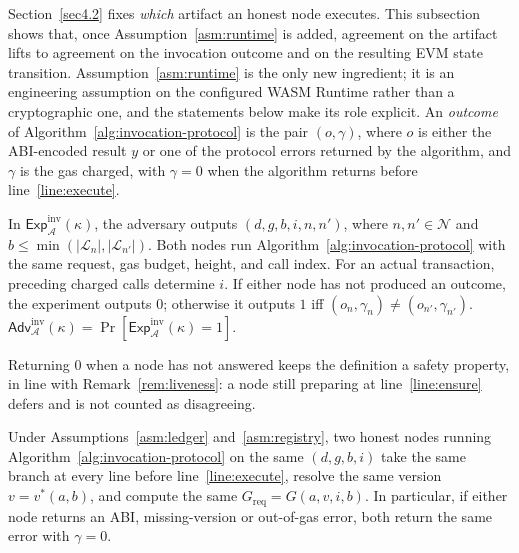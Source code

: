 \documentclass[runningheads]{llncs}
\begin{document}
Section~\ref{sec4.2} fixes \emph{which} artifact an honest node executes. This subsection shows that, once Assumption~\ref{asm:runtime} is added, agreement on the artifact lifts to agreement on the invocation outcome and on the resulting EVM state transition. Assumption~\ref{asm:runtime} is the only new ingredient; it is an engineering assumption on the configured WASM Runtime rather than a cryptographic one, and the statements below make its role explicit. An \emph{outcome} of Algorithm~\ref{alg:invocation-protocol} is the pair $(o,\gamma)$, where $o$ is either the ABI-encoded result $y$ or one of the protocol errors returned by the algorithm, and $\gamma$ is the gas charged, with $\gamma=0$ when the algorithm returns before line~\ref{line:execute}.

\begin{definition}
\label{def:inv}
In $\mathsf{Exp}^{\mathrm{inv}}_{\mathcal{A}}(\kappa)$, the adversary outputs $(d,g,b,i,n,n')$, where $n,n'\in\mathcal{N}$ and $b\le\min(|\mathcal{L}_n|,|\mathcal{L}_{n'}|)$. Both nodes run Algorithm~\ref{alg:invocation-protocol} with the same request, gas budget, height, and call index. For an actual transaction, preceding charged calls determine $i$. If either node has not produced an outcome, the experiment outputs $0$; otherwise it outputs $1$ iff $(o_n,\gamma_n)\neq(o_{n'},\gamma_{n'})$. $\mathsf{Adv}^{\mathrm{inv}}_{\mathcal{A}}(\kappa)=\Pr[\mathsf{Exp}^{\mathrm{inv}}_{\mathcal{A}}(\kappa)=1]$.
\end{definition}

Returning $0$ when a node has not answered keeps the definition a safety property, in line with Remark~\ref{rem:liveness}: a node still preparing at line~\ref{line:ensure} defers and is not counted as disagreeing.

\begin{lemma}
\label{lem:preexec}
Under Assumptions~\ref{asm:ledger} and~\ref{asm:registry}, two honest nodes running Algorithm~\ref{alg:invocation-protocol} on the same $(d,g,b,i)$ take the same branch at every line before line~\ref{line:execute}, resolve the same version $v=v^{*}(a,b)$, and compute the same $G_{\mathrm{req}}=G(a,v,i,b)$. In particular, if either node returns an ABI, missing-version or out-of-gas error, both return the same error with $\gamma=0$.
\end{lemma}
\end{document}

